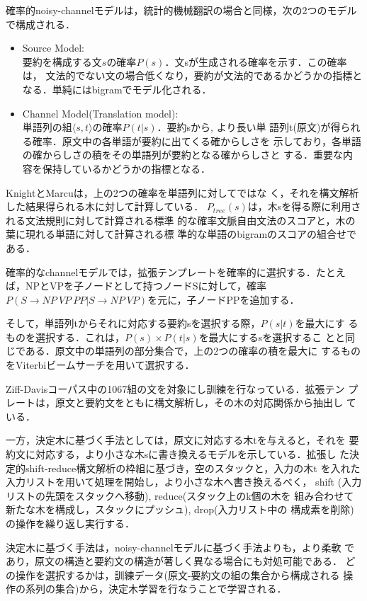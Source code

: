 確率的noisy-channelモデルは，統計的機械翻訳の場合と同様，次の2つのモデル
で構成される．
\begin{itemize}
 \item Source Model:\\
要約を構成する文$s$の確率$P(s)$．文sが生成される確率を示す．この確率は，
       文法的でない文の場合低くなり，要約が文法的であるかどうかの指標と
       なる．単純にはbigramでモデル化される．
 \item Channel Model(Translation model):\\
単語列の組$\langle s, t \rangle$の確率$P(t|s)$．要約sから, より長い単
語列t(原文)が得られる確率．原文中の各単語が要約に出てくる確からしさを
示しており，各単語の確からしさの積をその単語列が要約となる確からしさと
する．重要な内容を保持しているかどうかの指標となる．
\end{itemize}

KnightとMarcuは，上の2つの確率を単語列に対してではな
く，それを構文解析した結果得られる木に対して計算している．
$P_{tree}(s)$は，木sを得る際に利用される文法規則に対して計算される標準
的な確率文脈自由文法のスコアと，木の葉に現れる単語に対して計算される標
準的な単語のbigramのスコアの組合せである．

確率的なchannelモデルでは，拡張テンプレートを確率的に選択する．たとえ
ば，NPとVPを子ノードとして持つノードSに対して，確率$P(S \rightarrow NP
\: VP \: PP | S \rightarrow NP \: VP)$を元に，子ノードPPを追加する．

そして，単語列tからそれに対応する要約sを選択する際，$P(s|t)$を最大にす
るものを選択する．これは，$P(s)\times P(t|s)$を最大にするsを選択するこ
とと同じである．原文中の単語列の部分集合で，上の2つの確率の積を最大に
するものをViterbiビームサーチを用いて選択する．

Ziff-Davisコーパス中の1067組の文を対象にし訓練を行なっている．拡張テン
プレートは，原文と要約文をともに構文解析し，その木の対応関係から抽出し
ている．

一方，決定木に基づく手法としては，原文に対応する木tを与えると，それを
要約文に対応する，より小さな木sに書き換えるモデルを示している．拡張し
た決定的shift-reduce構文解析の枠組に基づき，空のスタックと，入力の木t
を入れた入力リストを用いて処理を開始し，より小さな木へ書き換えるべく，
shift (入力リストの先頭をスタックへ移動), reduce(スタック上のk個の木を
組み合わせて新たな木を構成し，スタックにプッシュ), drop(入力リスト中の
構成素を削除)の操作を繰り返し実行する．

決定木に基づく手法は，noisy-channelモデルに基づく手法よりも，より柔軟
であり，原文の構造と要約文の構造が著しく異なる場合にも対処可能である．
どの操作を選択するかは，訓練データ(原文-要約文の組の集合から構成される
操作の系列の集合)から，決定木学習を行なうことで学習される．

